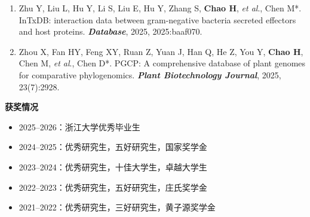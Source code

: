 {\begin{enumerate}[leftmargin=*, itemsep=1pt, parsep=0pt, topsep=0pt]
    \item Zhu Y, Liu L, Hu Y, Li S, Liu E, Hu Y, Zhang S, \textbf{Chao H}, \textit{et al}., Chen M*.
    InTxDB: interaction data between gram-negative bacteria secreted effectors and host proteins. 
    \textbf{\textit{Database}}, 2025, 2025:baaf070.

    \item Zhou X, Fan HY, Feng XY, Ruan Z, Yuan J, Han Q, He Z, You Y, \textbf{Chao H}, Chen M, \textit{et al}., Chen D*.
    PGCP: A comprehensive database of plant genomes for comparative phylogenomics. 
    \textbf{\textit{Plant Biotechnology Journal}}, 2025, 23(7):2928.

    \end{enumerate}
}

\noindent
\textbf{获奖情况}

{
\linespread{1}\selectfont  %
\begin{itemize}[leftmargin=*, itemsep=0pt, parsep=0pt, topsep=0pt]
    \item 2025--2026：浙江大学优秀毕业生
    \item 2024--2025：优秀研究生，五好研究生，国家奖学金
    \item 2023--2024：优秀研究生，十佳大学生，卓越大学生
    \item 2022--2023：优秀研究生，五好研究生，庄氏奖学金
    \item 2021--2022：优秀研究生，三好研究生，黄子源奖学金
\end{itemize}
}

\noindent